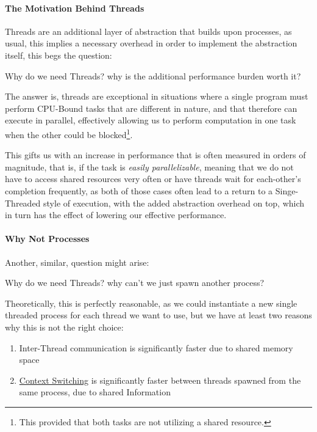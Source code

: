 \documentclass[openright, twoside]{report}
\theoremstyle{definition}
\theoremstyle{example}
\begin{document}
			\paragraph{The Motivation Behind Threads}
			Threads are an additional layer of abstraction that builds upon processes,
			as usual, this implies a necessary overhead in order to implement the abstraction
			itself, this begs the question:

			\begin{center}
				Why do we need Threads? why is the additional performance burden worth it?
			\end{center}

			The answer is, threads are exceptional in situations where a single program 
			must perform CPU-Bound tasks that are different in nature, and that therefore
			can execute in parallel, effectively allowing us to perform computation in one 
			task when the other could be blocked\footnote{This provided that both tasks are
			not utilizing a shared resource.}.

			This gifts us with an increase in performance that is often measured in orders 
			of magnitude, that is, if the task is \emph{easily parallelizable}, meaning that 
			we do not have to access shared resources very often or have threads wait for
			each-other's completion frequently, as both of those cases often lead to a return
			to a Singe-Threaded style of execution, with the added abstraction overhead on top,
			which in turn has the effect of lowering our effective performance.

			\paragraph{Why Not Processes}
			Another, similar, question might arise:
			\begin{center}
				Why do we need Threads? why can't we just spawn another process?
			\end{center}

			Theoretically, this is perfectly reasonable, as we could instantiate
			a new single threaded process for each thread we want to use, but we
			have at least two reasons why this is not the right choice:
			\begin{enumerate}
				\item Inter-Thread communication is significantly faster due to
				shared memory space
				\item \hyperref[ssec:context]{Context Switching} is significantly faster between threads 
				spawned from the same process, due to shared Information
			\end{enumerate}
\end{document}
